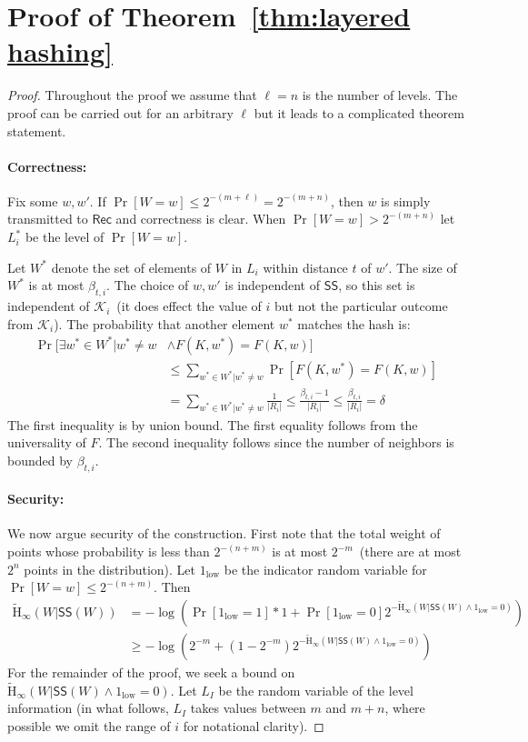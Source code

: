 \documentclass[11pt]{article}
\newcommand{\thref}[1]{\mbox{Theorem~\ref{#1}}}
\newcommand{\class}[1]{{\ensuremath{\mathsf{#1}}}}
\newcommand{\sketch}{\ensuremath{\class{SS}}\xspace}
\newcommand{\rec}{\ensuremath{\class{Rec}}\xspace}
\newcommand{\Hav}{\tilde{\mathrm{H}}_\infty}
\begin{document}
\section{Proof of \thref{thm:layered hashing}}
\label{sec:proof of layered hashing}
\begin{proof}
Throughout the proof we assume that $\ell = n$ is the number of levels.  The proof can be carried out for an arbitrary $\ell$ but it leads to a complicated theorem statement.

\paragraph{Correctness:}  Fix some $w, w'$.  If $\Pr[W=w]\le 2^{-(m+\ell)} = 2^{-(m+n)}$, then $w$ is simply transmitted to $\rec$ and correctness is clear.  When $\Pr[W=w]> 2^{-(m+n)}$ let $L_i^*$ be the level of $\Pr[W=w]$.

Let $W^*$ denote the set of elements of $W$ in $L_i$ within distance $t$ of $w'$.  The size of $W^*$ is at most $\beta_{t,i}$. The choice of $w, w'$ is independent of $\sketch$, so this set is independent of $\mathcal{K}_i$~(it does effect the value of $i$ but not the particular outcome from $\mathcal{K}_i$).  The probability that another element $w^*$ matches the hash is:
\begin{align*}
\Pr[\exists w^* \in W^* |w^* \neq w &\wedge F(K, w^*) = F(K, w)]\\ &\le \sum_{w^*\in W^* | w^*\neq w} \Pr[F(K, w^*) = F(K, w)] \\
 &= \sum_{w^*\in W^* | w^*\neq w} \frac{1}{|R_i|} \le \frac{\beta_{t,i}-1}{|R_i|}\le \frac{\beta_{t, i}}{|R_i|} = \delta
\end{align*}
The first inequality is by union bound. The first equality follows from the universality of $F$.  The second inequality follows since the number of neighbors is bounded by $\beta_{t,i}$.  

\paragraph{Security:}
We now argue security of the construction.  First note that the total weight of points whose probability is less than $2^{-(n+m)}$ is at most $2^{-m}$~(there are at most $2^n$ points in the distribution).  Let $1_{\text{low}}$ be the indicator random variable for $\Pr[W=w]\le 2^{-(n+m)}$.  Then 
\begin{align}
\Hav(W | \sketch(W)) &= -\log \left(\Pr[1_{\text{low}}=1] * 1 + \Pr[1_{\text{low}} =0]   2^{-\Hav(W | \sketch(W) \wedge 1_{\text{low}} = 0)}\right)\nonumber\\
&\ge -\log\left( 2^{-m} + (1-2^{-m})2^{-\Hav(W | \sketch(W) \wedge 1_{\text{low}} = 0)}\label{eq:min-entropy}\right)
\end{align}
For the remainder of the proof, we seek a bound on $\Hav(W | \sketch(W) \wedge 1_{\text{low}} =0).$  Let $L_I$ be the random variable of the level information (in what follows, $L_I$ takes values between $m$ and $m+n$, where possible we omit the range of $i$ for notational clarity). 


\end{proof}
\end{document}

